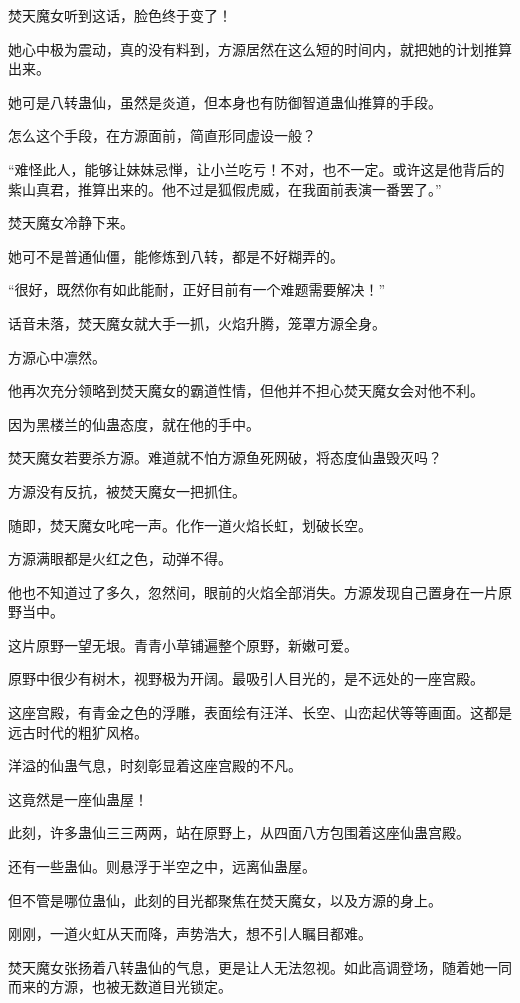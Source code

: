 \begin{this_body}
焚天魔女听到这话，脸色终于变了！

她心中极为震动，真的没有料到，方源居然在这么短的时间内，就把她的计划推算出来。

她可是八转蛊仙，虽然是炎道，但本身也有防御智道蛊仙推算的手段。

怎么这个手段，在方源面前，简直形同虚设一般？

“难怪此人，能够让妹妹忌惮，让小兰吃亏！不对，也不一定。或许这是他背后的紫山真君，推算出来的。他不过是狐假虎威，在我面前表演一番罢了。”

焚天魔女冷静下来。

她可不是普通仙僵，能修炼到八转，都是不好糊弄的。

“很好，既然你有如此能耐，正好目前有一个难题需要解决！”

话音未落，焚天魔女就大手一抓，火焰升腾，笼罩方源全身。

方源心中凛然。

他再次充分领略到焚天魔女的霸道性情，但他并不担心焚天魔女会对他不利。

因为黑楼兰的仙蛊态度，就在他的手中。

焚天魔女若要杀方源。难道就不怕方源鱼死网破，将态度仙蛊毁灭吗？

方源没有反抗，被焚天魔女一把抓住。

随即，焚天魔女叱咤一声。化作一道火焰长虹，划破长空。

方源满眼都是火红之色，动弹不得。

他也不知道过了多久，忽然间，眼前的火焰全部消失。方源发现自己置身在一片原野当中。

这片原野一望无垠。青青小草铺遍整个原野，新嫩可爱。

原野中很少有树木，视野极为开阔。最吸引人目光的，是不远处的一座宫殿。

这座宫殿，有青金之色的浮雕，表面绘有汪洋、长空、山峦起伏等等画面。这都是远古时代的粗犷风格。

洋溢的仙蛊气息，时刻彰显着这座宫殿的不凡。

这竟然是一座仙蛊屋！

此刻，许多蛊仙三三两两，站在原野上，从四面八方包围着这座仙蛊宫殿。

还有一些蛊仙。则悬浮于半空之中，远离仙蛊屋。

但不管是哪位蛊仙，此刻的目光都聚焦在焚天魔女，以及方源的身上。

刚刚，一道火虹从天而降，声势浩大，想不引人瞩目都难。

焚天魔女张扬着八转蛊仙的气息，更是让人无法忽视。如此高调登场，随着她一同而来的方源，也被无数道目光锁定。


\end{this_body}
